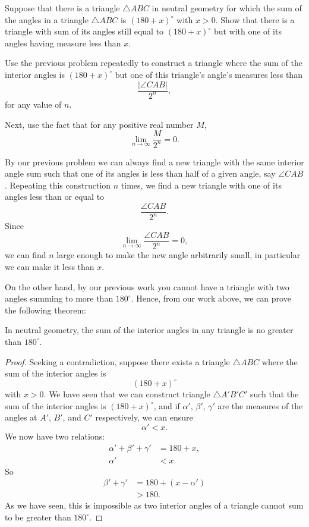 \documentclass[noauthor,nooutcomes,12pt,hints,newpage,handout]{ximera}
\begin{document}
\begin{problem}
\label{121} Suppose that there is a triangle $\triangle ABC$ in
neutral geometry for which the sum of the angles in a triangle $\triangle
ABC$ is $\left( 180+x\right)^\circ$ with $x>0$. Show that there is a
triangle with sum of its angles still equal to $\left(180+x\right)^\circ$
but with one of its angles having measure less than $x$. %


\begin{hint}
Use the previous problem repeatedly to construct a triangle where the sum of the
interior angles is $(180+x)^\circ$ but one of this triangle's angle's measures less than
\[
\frac{|\angle CAB|}{2^n},
\]
for any value of $n$.
\end{hint}
\begin{hint}
Next, use the fact that for any positive real number $M$,
\[
\lim_{n\to \infty}\frac{M}{2^n} = 0.
\]
\end{hint}
\begin{freeResponse}
By our previous problem we can always find a new triangle with the
same interior angle sum such that one of its angles is less than half
of a given angle, say $\angle CAB$. Repeating this construction $n$
times, we find a new triangle with one of its angles less than or
equal to
\[
\frac{\angle CAB}{2^n}.
\]
Since 
\[
\lim_{n\to \infty}\frac{\angle CAB}{2^n} = 0,
\]
we can find $n$ large enough to make the new angle arbitrarily small, in
particular we can make it less than $x$.
\end{freeResponse}

\end{problem}


On the other hand, by our previous work
you cannot have a triangle with two angles summing to more than
$180^\circ$. Hence, from our work above, we can prove the following
theorem:

\begin{theorem}
In neutral geometry, the sum of the interior angles in any triangle is no greater
than $180^\circ$.
\end{theorem}

\begin{proof}
Seeking a contradiction, suppose there exists a triangle $\triangle
ABC$ where the sum of the interior angles is 
\[
\left(180+x\right)^\circ
\]
with $x>0$. We have seen that we can construct triangle $\triangle
A'B'C'$ such that the sum of the interior angles is $(180+x)^\circ$,
and if $\alpha'$, $\beta'$, $\gamma'$ are the measures of the angles
at $A'$, $B'$, and $C'$ respectively, we can ensure 
\[
\alpha' < x.
\]
We now have two relations:
\begin{align*}
\alpha' + \beta' + \gamma' &= 180 + x,\\
\alpha' &< x.
\end{align*}
So%
\begin{align*}
\beta'+\gamma'&=180+\left(x-\alpha'\right)\\
&>180.
\end{align*}
As we have seen, this is impossible as two interior angles of a
triangle cannot sum to be greater than $180^\circ$.
\end{proof}
\end{document}
